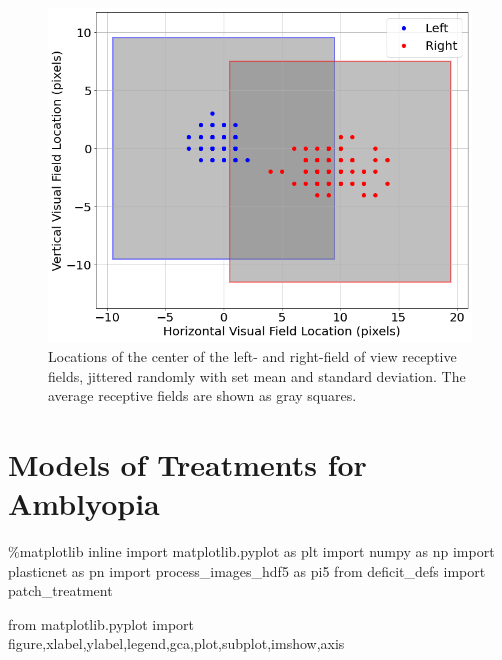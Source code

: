 \documentclass[
  letterpaper,
  number]{elsarticle}
\newenvironment{Shaded}{\begin{snugshade}}{\end{snugshade}}
\newcommand{\ImportTok}[1]{\textcolor[rgb]{0.00,0.46,0.62}{#1}}
\newcommand{\NormalTok}[1]{\textcolor[rgb]{0.00,0.23,0.31}{#1}}
\newcommand{\OperatorTok}[1]{\textcolor[rgb]{0.37,0.37,0.37}{#1}}
\begin{document}
\begin{figure}[H]

{\centering \includegraphics{./Deficit Models_files/figure-pdf/fig-jitter-input-locations-output-1.png}

}

\caption{\label{fig-jitter-input-locations}Locations of the center of
the left- and right-field of view receptive fields, jittered randomly
with set mean and standard deviation. The average receptive fields are
shown as gray squares.}

\end{figure}

\hypertarget{sec-models-of-treatments}{%
\chapter{Models of Treatments for
Amblyopia}\label{sec-models-of-treatments}}

\begin{Shaded}
\begin{Highlighting}[]
\OperatorTok{\%}\NormalTok{matplotlib inline}
\ImportTok{import}\NormalTok{ matplotlib.pyplot }\ImportTok{as}\NormalTok{ plt}
\ImportTok{import}\NormalTok{ numpy }\ImportTok{as}\NormalTok{ np}
\ImportTok{import}\NormalTok{ plasticnet }\ImportTok{as}\NormalTok{ pn}
\ImportTok{import}\NormalTok{ process\_images\_hdf5 }\ImportTok{as}\NormalTok{ pi5}
\ImportTok{from}\NormalTok{ deficit\_defs }\ImportTok{import}\NormalTok{ patch\_treatment}

\ImportTok{from}\NormalTok{ matplotlib.pyplot }\ImportTok{import}\NormalTok{ figure,xlabel,ylabel,legend,gca,plot,subplot,imshow,axis}
\end{Highlighting}
\end{Shaded}
\end{document}
